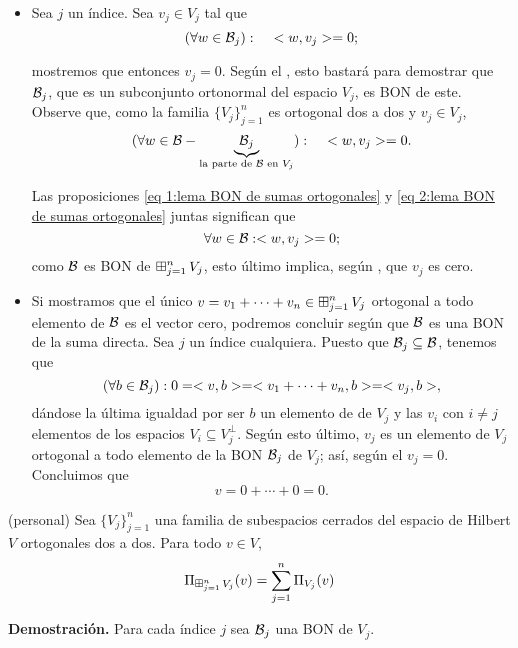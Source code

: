 \begin{itemize}
\item Sea $j$ un índice. 
Sea $v_{j} \in V_{j}$ tal que 
\begin{equation} \label{eq 1:lema BON de sumas ortogonales}
(\forall w \in \mathcal{B}_{j}):
\hspace{0.5cm} <w, v_{j}>=0;
\end{equation}


mostremos que entonces $v_{j} =0$. Según el 
, esto bastará para demostrar que
$\mathcal{B}_{j}$, que es un subconjunto ortonormal
del espacio $V_{j}$, es BON de este. \\
Observe que, como la familia $\{ V_{j} \}_{j=1}^{n}$
es ortogonal dos a dos y $v_{j} \in V_{j}$,
\begin{equation} \label{eq 2:lema BON de sumas ortogonales}
(\forall w \in \mathcal{B}- \underbrace{\mathcal{B}_{j}}_{\text{la
parte de } \mathcal{B} \text{ en } V_{j}}): \hspace{0.5cm}
<w, v_{j}>=0.
\end{equation}

Las proposiciones \eqref{eq 1:lema BON de sumas ortogonales}
y \eqref{eq 2:lema BON de sumas ortogonales}
juntas significan que
\[
\forall w \in \mathcal{B}: <w, v_{j}>=0;
\]
como $\mathcal{B}$ es BON de $\operatorname*{{\boxplus}}_{j =1 }^{n} V_{j}$,
esto último implica, según ,
que $v_{j}$ es cero.



\item Si mostramos
que el único $v=v_{1} + \cdots + v_{n} \in \operatorname*{{\boxplus}}_{j =1 }^{n} V_{j}$
ortogonal a todo elemento de $\mathcal{B}$ 
es el vector cero, podremos concluir según 
que $\mathcal{B}$ es una BON de la suma directa.
Sea $j$ un índice cualquiera. Puesto que
$\mathcal{B}_{j} \subseteq \mathcal{B}$, tenemos que
\[
(\forall b \in \mathcal{B}_{j}): 
0=<v,b> = <v_{1} + \cdots + v_{n}, b> = <v_{j}, b>,
\]
dándose la última igualdad por ser $b$ un elemento de 
de $V_{j}$ y las $v_{i}$ con $i \neq j$ elementos
de los espacios $V_{i} \subseteq V_{j}^{\perp}$.
Según esto último, $v_{j}$ es un elemento de $V_{j}$
ortogonal a todo elemento de la BON $\mathcal{B}_{j}$ 
de $V_{j}$; así, 
según el  $v_{j}=0$. 
Concluimos que
\[
v=0 + \cdots + 0=0.
\]

\end{itemize}
\QEDB
\vspace{0.2cm}



\begin{lema} \label{lema: proyección sobre la suma ortogonal}
 (personal)
Sea $\{ V_{j} \}_{j=1}^{n}$ una familia
de subespacios cerrados del espacio de Hilbert $V$ ortogonales
dos a dos.
Para todo $v \in V$, 
\[
\Pi_{\operatorname*{{\boxplus}}_{j =1 }^{n} V_{j}}(v)
= \sum\limits_{j=1}^{n}\Pi_{V_{j}}(v)
\]
\end{lema}
\noindent
\textbf{Demostración.}
Para cada índice $j$ sea $\mathcal{B}_{j}$ una
BON de $V_{j}$. 

